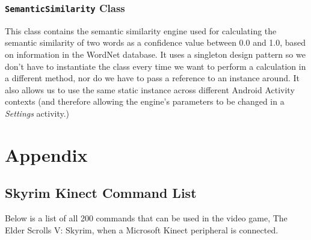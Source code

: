 \documentclass[12pt]{article}
\begin{document}
\subsubsection{\texttt{SemanticSimilarity} Class}

This class contains the semantic similarity engine used for calculating the semantic similarity of two words as a confidence value between 0.0 and 1.0, based on information in the WordNet database. It uses a singleton design pattern so we don't have to instantiate the class every time we want to perform a calculation in a different method, nor do we have to pass a reference to an instance around. It also allows us to use the same static instance across different Android Activity contexts (and therefore allowing the engine's parameters to be changed in a \textit{Settings} activity.)

\newpage
\section{Appendix}
\subsection{Skyrim Kinect Command List}
Below is a list of all 200 commands that can be used in the video game, The Elder Scrolls V: Skyrim, when a Microsoft Kinect peripheral is connected.
\end{document}
